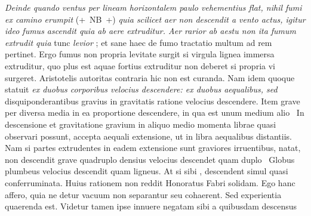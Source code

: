 \textit{Deinde quando ventus per lineam horizontalem paulo vehementius flat, nihil fumi ex camino erumpit} (+~NB~+)
\textit{quia scilicet aer non descendit a vento actus, igitur ideo fumus ascendit quia ab aere
extruditur. Aer
rarior ab aestu non ita fumum extrudit quia} tunc \textit{levior }; et sane haec de fumo tractatio multum ad rem pertinet. Ergo fumus\protect{} non propria levitate surgit si virgula lignea immersa extruditur, quo plus est aquae fortius extruditur non deberet si propria vi surgeret.
Aristotelis\protect{} autoritas\protect{} contraria hic non est curanda. Nam idem quoque statuit \textit{ex duobus corporibus  velocius descendere: ex duobus aequalibus, sed} disquiponderantibus gravius in gravitatis ratione velocius descendere. Item grave per diversa media in ea proportione descendere, in qua est unum medium alio 
\pend
\pstart {} \, In descensione\protect{} et gravitatione gravium in aliquo medio momenta librae quasi observari possunt, accepta aequali extensione, ut in libra aequalibus distantiis. Nam si partes extrudentes in eadem extensione sunt graviores irruentibus, natat, non descendit  grave quadruplo densius velocius descendet quam duplo 
\pend
\pstart
{} \, Globus plumbeus\protect{} velocius descendit quam ligneus\protect{}. At si sibi , descendent simul quasi conferruminata. Huius rationem non reddit
Honoratus Fabri\protect{} solidam. Ego hanc affero, quia ne detur vacuum  non separantur seu cohaerent. Sed experientia quaerenda est. Videtur tamen ipse innuere negatam sibi a quibusdam descensus 

